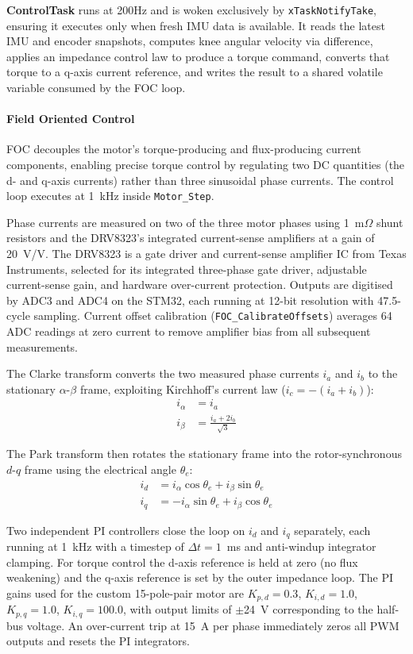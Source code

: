 \documentclass[11pt]{article}
\begin{document}
\textbf{ControlTask} runs at 200Hz and is woken exclusively by \texttt{xTaskNotifyTake}, ensuring it executes only when fresh IMU data is available. It reads the latest IMU and encoder snapshots, computes knee angular velocity via difference, applies an impedance control law to produce a torque command, converts that torque to a q-axis current reference, and writes the result to a shared volatile variable consumed by the FOC loop.

\paragraph{Field Oriented Control}

FOC decouples the motor's torque-producing and flux-producing current components, enabling precise torque control by regulating two DC quantities (the d- and q-axis currents) rather than three sinusoidal phase currents. The control loop executes at 1~kHz inside \texttt{Motor\_Step}.

Phase currents are measured on two of the three motor phases using 1~m$\Omega$ shunt resistors and the DRV8323's integrated current-sense amplifiers at a gain of 20~V/V. The DRV8323 is a gate driver and current-sense amplifier IC from Texas Instruments, selected for its integrated three-phase gate driver, adjustable current-sense gain, and hardware over-current protection. Outputs are digitised by ADC3 and ADC4 on the STM32, each running at 12-bit resolution with 47.5-cycle sampling. Current offset calibration (\texttt{FOC\_CalibrateOffsets}) averages 64 ADC readings at zero current to remove amplifier bias from all subsequent measurements.

The Clarke transform converts the two measured phase currents $i_a$ and $i_b$ to the stationary $\alpha$-$\beta$ frame, exploiting Kirchhoff's current law ($i_c = -(i_a + i_b)$):
\begin{align}
    i_\alpha &= i_a \\
    i_\beta  &= \frac{i_a + 2i_b}{\sqrt{3}}
\end{align}

The Park transform then rotates the stationary frame into the rotor-synchronous $d$-$q$ frame using the electrical angle $\theta_e$:
\begin{align}
    i_d &=  i_\alpha \cos\theta_e + i_\beta \sin\theta_e \\
    i_q &= -i_\alpha \sin\theta_e + i_\beta \cos\theta_e
\end{align}

Two independent PI controllers close the loop on $i_d$ and $i_q$ separately, each running at 1~kHz with a timestep of $\Delta t = 1$~ms and anti-windup integrator clamping. For torque control the d-axis reference is held at zero (no flux weakening) and the q-axis reference is set by the outer impedance loop. The PI gains used for the custom 15-pole-pair motor are $K_{p,d} = 0.3$, $K_{i,d} = 1.0$, $K_{p,q} = 1.0$, $K_{i,q} = 100.0$, with output limits of $\pm$24~V corresponding to the half-bus voltage. An over-current trip at 15~A per phase immediately zeros all PWM outputs and resets the PI integrators.
\end{document}

